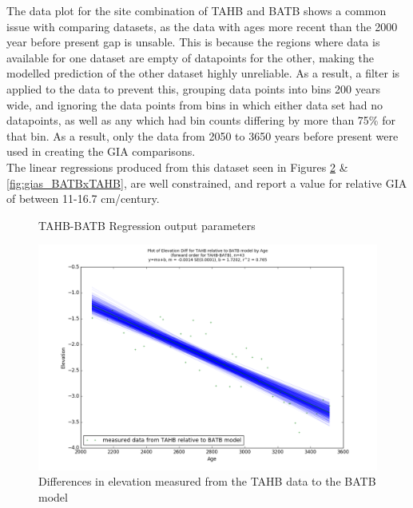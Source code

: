 The data plot for the site combination of TAHB and BATB shows a common issue
with comparing datasets, as the data with ages more recent than the 2000 year before
present gap is unsable. This is because the regions where data is available for
one dataset are empty of datapoints for the other, making the modelled prediction
of the other dataset highly unreliable. As a result, a filter is applied to the
data to prevent this, grouping data points into bins 200 years wide, and
ignoring the data points from bins in which either data set had no datapoints,
as well as any which had bin counts differing by more than 75\% for that bin.
As a result, only the data from 2050 to 3650 years before present were used in
creating the GIA comparisons.\\
The linear regressions produced from this dataset seen in Figures 
\ref{fig:gias_TAHBxBATB} \& \ref{fig:gias_BATBxTAHB}, are well constrained, and
report a value for relative GIA of between 11-16.7 cm/century. \\


\begin{figure}[H]
	\begin{flushleft}
	\end{flushleft}
	\caption{TAHB-BATB Regression output parameters}
	\label{fig:TAHBxBATB_regression}
\end{figure}


\newpage

\begin{figure}[H]
	\includegraphics[width=0.9\linewidth]{data/bothNonZero/withinSeventyFivePercent/gias/theGIA_TAHB_relative_to_BATB.png}
	\caption{Differences in elevation measured from the TAHB data to the BATB model}
	\label{fig:gias_TAHBxBATB}
\end{figure}
\newpage


